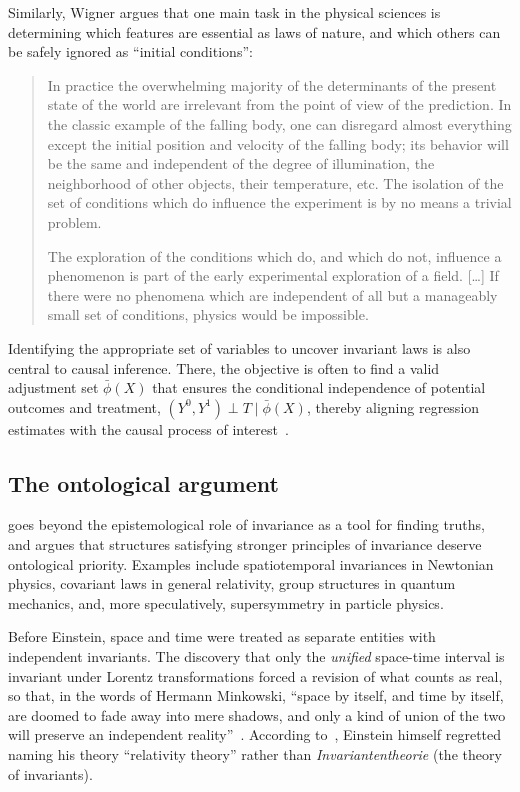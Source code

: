 Similarly, Wigner argues that one main task in the physical sciences is determining which features are essential as laws of nature, and which others can be safely ignored as ``initial conditions'':
\begin{quote}
In practice the overwhelming majority of the determinants of the present state of the world are irrelevant from the point of view of the prediction. In the classic example of the falling body, one can disregard almost everything except the initial position and velocity of the falling body; its behavior will be the same and independent of the degree of illumination, the neighborhood of other objects, their temperature, etc. The isolation of the set of conditions which do influence the experiment is by no means a trivial problem.~\citep[p. 4]{wigner1967}

The exploration of the conditions which do, and which do not, influence a phenomenon is part of the early experimental exploration of a field. [\ldots] If there were no phenomena which are independent of all but a manageably small set of conditions, physics would be impossible.~\citep[pp. 226--227]{wigner1967}
\end{quote}

Identifying the appropriate set of variables to uncover invariant laws is also central to causal inference. There, the objective is often to find a valid adjustment set $\bar\phi(X)$ that ensures the conditional independence of potential outcomes and treatment, $(Y^0, Y^1) \perp T \mid \bar\phi(X)$, thereby aligning regression estimates with the causal process of interest~\citep{hernan2010causal}.

\subsection{The ontological argument}

\citet{nozick2001} goes beyond the epistemological role of invariance as a tool for finding truths, and argues that structures satisfying stronger principles of invariance deserve ontological priority. Examples include spatiotemporal invariances in Newtonian physics, covariant laws in general relativity, group structures in quantum mechanics, and, more speculatively, supersymmetry in particle physics.

Before Einstein, space and time were treated as separate entities with independent invariants. The discovery that only the \emph{unified} space-time interval is invariant under Lorentz transformations forced a revision of what counts as real, so that, in the words of Hermann Minkowski, ``space by itself, and time by itself, are doomed to fade away into mere shadows, and only a kind of union of the two will preserve an independent reality''~\citep[p. 75]{minkowski1909}. According to~\citet[p. 270]{urvsivc2006einstein}, Einstein himself regretted naming his theory ``relativity theory'' rather than \emph{Invariantentheorie} (the theory of invariants).

